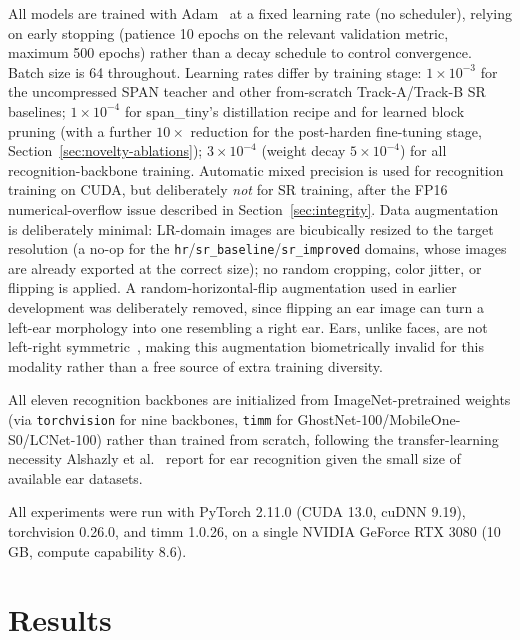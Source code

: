 \documentclass[pdflatex,sn-vancouver-num]{sn-jnl}
\begin{document}
All models are trained with Adam~\cite{kingma2015adam} at a fixed learning rate (no scheduler), relying on early stopping (patience 10 epochs on the relevant validation metric, maximum 500 epochs) rather than a decay schedule to control convergence. Batch size is 64 throughout. Learning rates differ by training stage: $1\times10^{-3}$ for the uncompressed SPAN teacher and other from-scratch Track-A/Track-B SR baselines; $1\times10^{-4}$ for span\_tiny's distillation recipe and for learned block pruning (with a further $10\times$ reduction for the post-harden fine-tuning stage, Section~\ref{sec:novelty-ablations}); $3\times10^{-4}$ (weight decay $5\times10^{-4}$) for all recognition-backbone training. Automatic mixed precision is used for recognition training on CUDA, but deliberately \emph{not} for SR training, after the FP16 numerical-overflow issue described in Section~\ref{sec:integrity}. Data augmentation is deliberately minimal: LR-domain images are bicubically resized to the target resolution (a no-op for the \texttt{hr}/\texttt{sr\_baseline}/\texttt{sr\_improved} domains, whose images are already exported at the correct size); no random cropping, color jitter, or flipping is applied. A random-horizontal-flip augmentation used in earlier development was deliberately removed, since flipping an ear image can turn a left-ear morphology into one resembling a right ear. Ears, unlike faces, are not left-right symmetric~\cite{ozturk2025bilateral}, making this augmentation biometrically invalid for this modality rather than a free source of extra training diversity.

All eleven recognition backbones are initialized from ImageNet-pretrained weights (via \texttt{torchvision} for nine backbones, \texttt{timm} for GhostNet-100/MobileOne-S0/LCNet-100) rather than trained from scratch, following the transfer-learning necessity Alshazly et al.~\cite{alshazly2020unconstrained} report for ear recognition given the small size of available ear datasets.

All experiments were run with PyTorch 2.11.0 (CUDA 13.0, cuDNN 9.19), torchvision 0.26.0, and timm 1.0.26, on a single NVIDIA GeForce RTX 3080 (10\,GB, compute capability 8.6).

\section{Results}
\label{sec:results}
\end{document}
